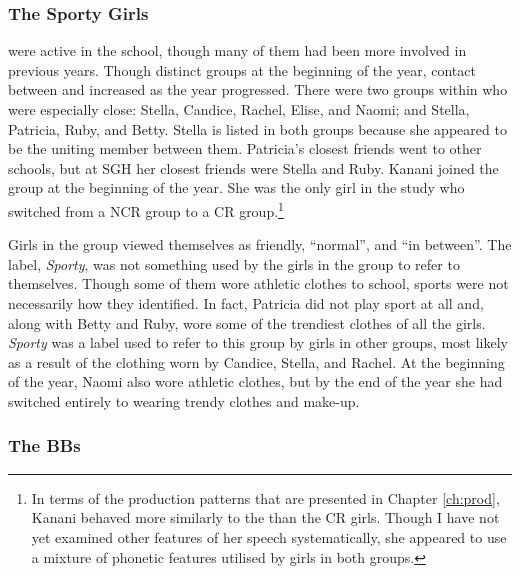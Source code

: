 \subsubsection{The Sporty Girls}
 were active in the school, though many of them had been more involved in previous years. Though distinct groups at the beginning of the year, contact between  and  increased as the year progressed. There were two groups within  who were especially close: Stella, Candice, Rachel, Elise, and Naomi; and Stella, Patricia, Ruby, and Betty. Stella is listed in both groups because she appeared to be the uniting member between them. Patricia's closest friends went to other schools, but at SGH her closest friends were Stella and Ruby. Kanani joined the group at the beginning of the year. She was the only girl in the study who switched from a NCR group to a CR group.\footnote{In terms of the production patterns that are presented in Chapter \ref{ch:prod}, Kanani behaved more similarly to the  than the CR girls. Though I have not yet examined other features of her speech systematically, she appeared to use a mixture of phonetic features utilised by girls in both groups.}

Girls in the group viewed themselves as friendly, ``normal'', and ``in between''. The label, \textsl{Sporty}, was not something used by the girls in the group to refer to themselves. Though some of them wore athletic clothes to school, sports were not necessarily how they identified. In fact, Patricia did not play sport at all and, along with Betty and Ruby, wore some of the trendiest clothes of all the girls. \textit{Sporty} was a label used to refer to this group by girls in other groups, most likely as a result of the clothing worn by Candice, Stella, and Rachel. At the beginning of the year, Naomi also wore athletic clothes, but by the end of the year she had switched entirely to wearing trendy clothes and make-up.


\subsubsection{The BBs}
\label{ex:pamodette}

